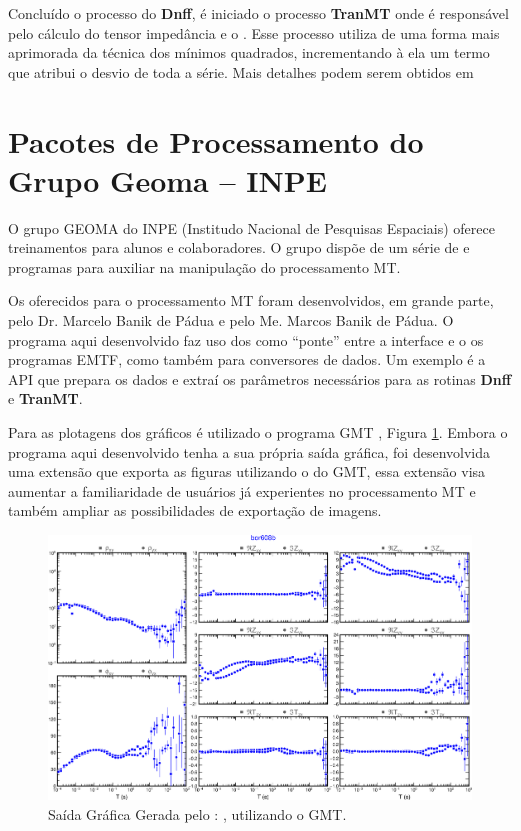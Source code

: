             Concluído o processo do \textbf{Dnff}, é iniciado o processo \textbf{TranMT} onde é responsável pelo cálculo do tensor impedância e o . Esse processo utiliza de uma forma mais aprimorada da técnica dos mínimos quadrados, incrementando à ela um termo que atribui o desvio de toda a série. Mais detalhes podem serem obtidos em \cite{robusto-egbert}
            
           
    \section{Pacotes de Processamento do Grupo Geoma -- INPE}
    
        O grupo GEOMA do INPE (Institudo Nacional de Pesquisas Espaciais) oferece treinamentos para alunos e colaboradores. O grupo dispõe de um série de  e programas para auxiliar na manipulação do processamento MT.

        Os  oferecidos para o processamento MT foram desenvolvidos, em grande parte, pelo Dr. Marcelo Banik de Pádua e pelo Me. Marcos Banik de Pádua. O programa aqui desenvolvido faz uso dos  como ``ponte'' entre a interface e o os programas EMTF, como também para conversores de dados. Um exemplo é a API  que prepara os dados e extraí os parâmetros necessários para as rotinas \textbf{Dnff} e \textbf{TranMT}. 
        
        Para as plotagens dos gráficos é utilizado o programa GMT \cite{gmt}, Figura \ref{plot-cmp-tf}. Embora o programa aqui desenvolvido tenha a sua própria saída gráfica, foi desenvolvida uma extensão que exporta as figuras utilizando o  do GMT, essa extensão visa aumentar a familiaridade de usuários já experientes no processamento MT e também ampliar as possibilidades de exportação de imagens.  
    
        \begin{figure}[H]
            \caption{Saída Gráfica Gerada pelo :  \cite{geoma-proc}, utilizando o GMT.}
                \begin{center}
                    \includegraphics[width=15cm]{texto/figura/plot-cmp-tf.png}
                \end{center}
            \label{plot-cmp-tf}
        \end{figure}

